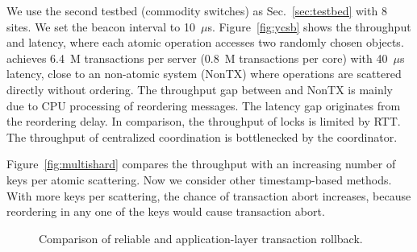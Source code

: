 We use the second testbed (commodity switches) as Sec.~\ref{sec:testbed} with 8 sites.
We set the beacon interval to 10~$\mu$s.
Figure~\ref{fig:ycsb} shows the throughput and latency, where each atomic operation accesses two randomly chosen objects.
\sys achieves 6.4~M transactions per server (0.8~M transactions per core) with 40~$\mu$s latency, close to an non-atomic system (NonTX) where operations are scattered directly without ordering.
The throughput gap between \sys and NonTX is mainly due to CPU processing of reordering messages.
The latency gap originates from the reordering delay.
In comparison, the throughput of locks is limited by RTT.
The throughput of centralized coordination is bottlenecked by the coordinator.


Figure~\ref{fig:multishard} compares the throughput with an increasing number of keys per atomic scattering.
Now we consider other timestamp-based methods.
With more keys per scattering, the chance of transaction abort increases, because reordering in any one of the keys would cause transaction abort.




\begin{figure}[t]
\centering
	\hspace{0.01\textwidth}
\caption{Comparison of reliable \sys and application-layer transaction rollback.}
\label{fig:ycsb-loss}
\end{figure}

